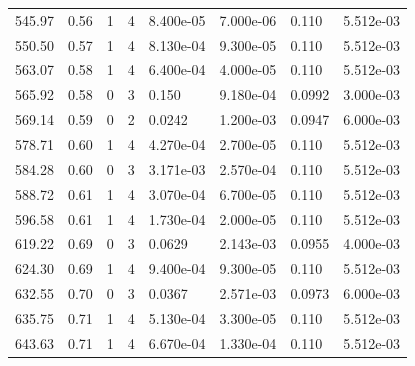 \documentclass[preview]{standalone}
\begin{document}
{{{\begin{tabular}{L{1.2cm}C{1.2cm} C{0.3cm}C{0.5cm} C{1.4cm}C{1.4cm} C{1.4cm}C{1.4cm}}
  545.97  &  0.56  & 1     &  4 &  8.400e-05  & 7.000e-06  & 0.110 &  5.512e-03   \\ 
  550.50  &  0.57  & 1     &  4 &  8.130e-04  & 9.300e-05  & 0.110 &  5.512e-03   \\ 
  563.07  &  0.58  & 1     &  4 &  6.400e-04  & 4.000e-05  & 0.110 &  5.512e-03   \\ 
  565.92  &  0.58  & 0     &  3 &  0.150  & 9.180e-04  & 0.0992 &  3.000e-03   \\ 
  569.14  &  0.59  & 0     &  2 &  0.0242  & 1.200e-03  & 0.0947 &  6.000e-03   \\ 
  578.71  &  0.60  & 1     &  4 &  4.270e-04  & 2.700e-05  & 0.110 &  5.512e-03   \\ 
  584.28  &  0.60  & 0     &  3 &  3.171e-03  & 2.570e-04  & 0.110 &  5.512e-03   \\ 
  588.72  &  0.61  & 1     &  4 &  3.070e-04  & 6.700e-05  & 0.110 &  5.512e-03   \\ 
  596.58  &  0.61  & 1     &  4 &  1.730e-04  & 2.000e-05  & 0.110 &  5.512e-03   \\ 
  619.22  &  0.69  & 0     &  3 &  0.0629  & 2.143e-03  & 0.0955 &  4.000e-03   \\ 
  624.30  &  0.69  & 1     &  4 &  9.400e-04  & 9.300e-05  & 0.110 &  5.512e-03   \\ 
  632.55  &  0.70  & 0     &  3 &  0.0367  & 2.571e-03  & 0.0973 &  6.000e-03   \\ 
  635.75  &  0.71  & 1     &  4 &  5.130e-04  & 3.300e-05  & 0.110 &  5.512e-03   \\ 
  643.63  &  0.71  & 1     &  4 &  6.670e-04  & 1.330e-04  & 0.110 &  5.512e-03   \\ 
\hline 
\end{tabular} 

}}}
\end{document}
